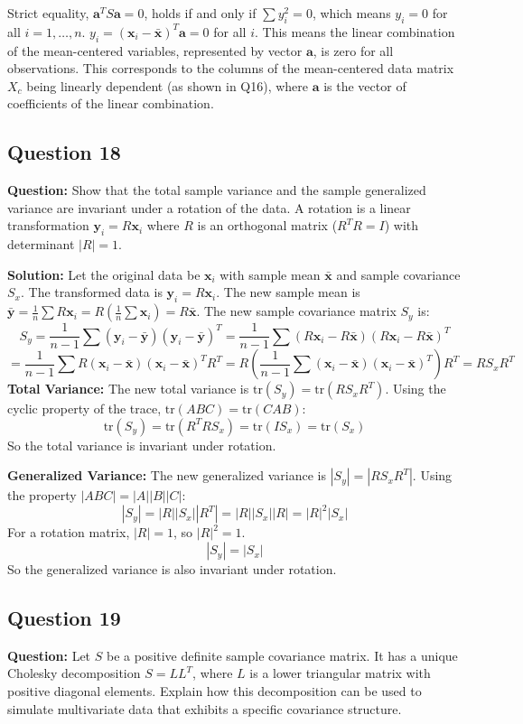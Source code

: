 Strict equality, $\mathbf{a}^T S \mathbf{a} = 0$, holds if and only if $\sum y_i^2 = 0$, which means $y_i = 0$ for all $i=1, \dots, n$.
$y_i = (\mathbf{x}_i - \bar{\mathbf{x}})^T \mathbf{a} = 0$ for all $i$. This means the linear combination of the mean-centered variables, represented by vector $\mathbf{a}$, is zero for all observations. This corresponds to the columns of the mean-centered data matrix $X_c$ being linearly dependent (as shown in Q16), where $\mathbf{a}$ is the vector of coefficients of the linear combination.

\subsection*{Question 18}
\textbf{Question:} Show that the total sample variance and the sample generalized variance are invariant under a rotation of the data. A rotation is a linear transformation $\mathbf{y}_i = R\mathbf{x}_i$ where $R$ is an orthogonal matrix ($R^T R = I$) with determinant $|R|=1$.

\textbf{Solution:}
Let the original data be $\mathbf{x}_i$ with sample mean $\bar{\mathbf{x}}$ and sample covariance $S_x$.
The transformed data is $\mathbf{y}_i = R\mathbf{x}_i$.
The new sample mean is $\bar{\mathbf{y}} = \frac{1}{n}\sum R\mathbf{x}_i = R(\frac{1}{n}\sum\mathbf{x}_i) = R\bar{\mathbf{x}}$.
The new sample covariance matrix $S_y$ is:
$$ S_y = \frac{1}{n-1} \sum (\mathbf{y}_i - \bar{\mathbf{y}})(\mathbf{y}_i - \bar{\mathbf{y}})^T = \frac{1}{n-1} \sum (R\mathbf{x}_i - R\bar{\mathbf{x}})(R\mathbf{x}_i - R\bar{\mathbf{x}})^T $$
$$ = \frac{1}{n-1} \sum R(\mathbf{x}_i - \bar{\mathbf{x}})(\mathbf{x}_i - \bar{\mathbf{x}})^T R^T = R \left( \frac{1}{n-1} \sum (\mathbf{x}_i - \bar{\mathbf{x}})(\mathbf{x}_i - \bar{\mathbf{x}})^T \right) R^T = R S_x R^T $$
\textbf{Total Variance:}
The new total variance is $\text{tr}(S_y) = \text{tr}(R S_x R^T)$. Using the cyclic property of the trace, $\text{tr}(ABC) = \text{tr}(CAB)$:
$$ \text{tr}(S_y) = \text{tr}(R^T R S_x) = \text{tr}(I S_x) = \text{tr}(S_x) $$
So the total variance is invariant under rotation.

\textbf{Generalized Variance:}
The new generalized variance is $|S_y| = |R S_x R^T|$. Using the property $|ABC| = |A||B||C|$:
$$ |S_y| = |R| |S_x| |R^T| = |R| |S_x| |R| = |R|^2 |S_x| $$
For a rotation matrix, $|R|=1$, so $|R|^2=1$.
$$ |S_y| = |S_x| $$
So the generalized variance is also invariant under rotation.

\subsection*{Question 19}
\textbf{Question:} Let $S$ be a positive definite sample covariance matrix. It has a unique Cholesky decomposition $S = LL^T$, where $L$ is a lower triangular matrix with positive diagonal elements. Explain how this decomposition can be used to simulate multivariate data that exhibits a specific covariance structure.

